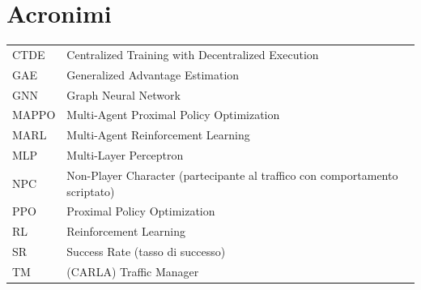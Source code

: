 \documentclass[12pt,a4paper,oneside]{report}
\begin{document}
\tableofcontents

\chapter*{Acronimi}
\begin{tabular}{ll}
CTDE  & Centralized Training with Decentralized Execution \\
GAE   & Generalized Advantage Estimation \\
GNN   & Graph Neural Network \\
MAPPO & Multi-Agent Proximal Policy Optimization \\
MARL  & Multi-Agent Reinforcement Learning \\
MLP   & Multi-Layer Perceptron \\
NPC   & Non-Player Character (partecipante al traffico con comportamento scriptato) \\
PPO   & Proximal Policy Optimization \\
RL    & Reinforcement Learning \\
SR    & Success Rate (tasso di successo) \\
TM    & (CARLA) Traffic Manager \\
\end{tabular}

\clearpage
{}








\appendix


\printbibliography[heading=bibintoc]
\end{document}

